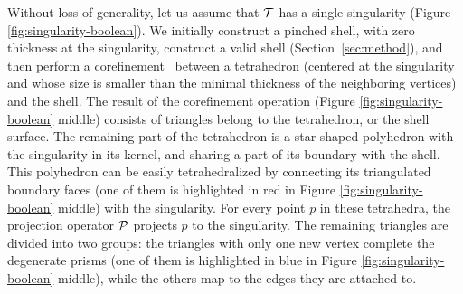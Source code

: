 Without loss of generality, let us assume that $\T$ has a single singularity (Figure \ref{fig:singularity-boolean}). We initially construct a pinched shell, with zero thickness at the singularity, construct a valid shell (Section~\ref{sec:method}), and then perform a corefinement~\cite{corefinement} between a tetrahedron (centered at the singularity and whose size is smaller than the minimal thickness of the neighboring vertices) and the shell. The result of the corefinement operation (Figure \ref{fig:singularity-boolean} middle) consists of triangles belong to the tetrahedron, or the shell surface. The remaining part of the tetrahedron is a star-shaped polyhedron with the singularity in its kernel, and sharing a part of its boundary with the shell. This polyhedron can be easily tetrahedralized by connecting its triangulated boundary faces (one of them is highlighted in red in Figure \ref{fig:singularity-boolean} middle) with the singularity. For every point $p$ in these tetrahedra, the projection operator $\P$ projects $p$ to the singularity. The remaining triangles are divided into two groups: 
the triangles with only one new vertex complete the degenerate prisms (one of them is highlighted in blue in Figure \ref{fig:singularity-boolean} middle), 
while the others map to the edges they are attached to.





